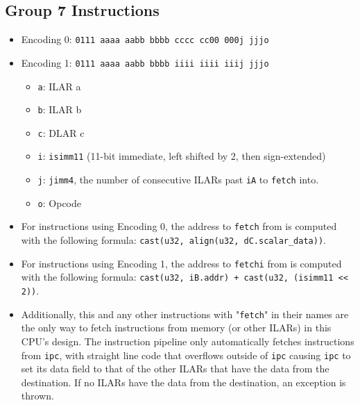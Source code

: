 \documentclass{article}
\begin{document}
	\subsection{Group 7 Instructions}
		\begin{itemize}
		\item Encoding 0: \texttt{0111 aaaa aabb bbbb  cccc cc00 000j jjjo}
		\item Encoding 1: \texttt{0111 aaaa aabb bbbb  iiii iiii iiij jjjo}
			\begin{itemize}
			\item \texttt{a}: ILAR a
			\item \texttt{b}: ILAR b
			\item \texttt{c}: DLAR c
			\item \texttt{i}: \texttt{isimm11} (11-bit immediate, left
				shifted by 2, then sign-extended)
			\item \texttt{j}: \texttt{jimm4}, the number of consecutive
				ILARs past \texttt{iA} to \texttt{fetch} into.
			\item \texttt{o}: Opcode
			\end{itemize}

		\item For instructions using Encoding 0, the address to
			\texttt{fetch} from is computed with the following formula:
			\texttt{cast(u32, align(u32, dC.scalar\_data))}.
		\item For instructions using Encoding 1, the address to
			\texttt{fetchi} from is computed with the following formula:
			\texttt{cast(u32, iB.addr) + cast(u32, (isimm11 << 2))}.
		\item Additionally, this and any other instructions with
			"\texttt{fetch}" in their names are the only way to fetch
			instructions from memory (or other ILARs) in this CPU's design.
			The instruction pipeline only automatically fetches
			instructions from \texttt{ipc}, with straight line code that
			overflows outside of \texttt{ipc} causing \texttt{ipc} to set
			its data field to that of the other ILARs that have the data
			from the destination. If no ILARs have the data from the
			destination, an exception is thrown.


\end{itemize}
\end{document}
